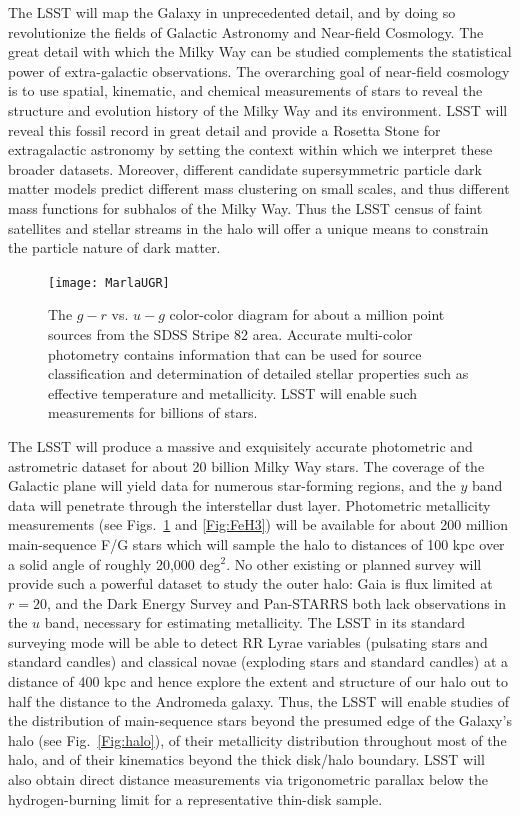 The LSST will map the Galaxy in unprecedented detail, and by doing so revolutionize the fields of Galactic
Astronomy and Near-field Cosmology. The great detail with which the Milky Way can be studied complements
the statistical power of extra-galactic observations.  The overarching goal of near-field cosmology is to use
spatial, kinematic, and chemical measurements of stars to reveal the structure and evolution history of the Milky Way
and its environment. LSST will reveal this fossil record in great detail and provide a Rosetta Stone for extragalactic
astronomy by setting the context within which we interpret these
broader datasets. Moreover, different candidate supersymmetric
particle dark matter models predict different mass clustering on small
scales, and thus different mass functions for subhalos of the Milky
Way.  Thus the LSST census of faint satellites and stellar streams in
the halo will offer a unique means to constrain the
particle nature of dark matter.


\begin{figure}
\texttt{[image: MarlaUGR]}
\caption{The $g-r$ vs. $u-g$ color-color diagram for about a million point sources
from the SDSS Stripe 82 area. Accurate multi-color photometry
contains information that can be used for source classification and determination of
detailed stellar properties such as effective temperature and metallicity. LSST will
enable such measurements for billions of stars.}
\label{Fig:FeH}
\end{figure}


The LSST will produce a massive and exquisitely accurate photometric and astrometric dataset for about 20 billion
Milky Way stars. The coverage of the Galactic plane will yield data for numerous star-forming
regions, and the $y$ band data will penetrate through the interstellar dust layer. Photometric metallicity
measurements (see Figs.~\ref{Fig:FeH} and \ref{Fig:FeH3}) will be available for about 200 million main-sequence
F/G stars which will sample the halo to distances of 100 kpc
\citep{2008ApJ...684..287I,2013ApJ...763...65A} over a solid angle of
roughly 20,000 deg$^2$. No other
existing or planned survey will provide such a powerful dataset to
study the outer halo: Gaia
is flux limited at $r=20$, and the Dark Energy Survey \citep{2011AJ....141..185R} and Pan-STARRS both
lack observations in the $u$ band, necessary for estimating metallicity. The LSST in its standard surveying mode will
be able to detect RR Lyrae variables (pulsating stars and standard candles) and classical novae (exploding stars
and standard candles) at a distance of 400 kpc and hence explore the extent and structure of our  halo out to
half the distance to the Andromeda galaxy. Thus, the LSST will enable studies of the distribution of main-sequence
stars beyond the presumed edge of the Galaxy's halo (see Fig.~\ref{Fig:halo}), of their metallicity distribution
throughout most of the halo, and of their kinematics beyond the thick disk/halo boundary. LSST will also obtain
direct distance measurements via trigonometric parallax below the hydrogen-burning limit for a representative
thin-disk sample.


